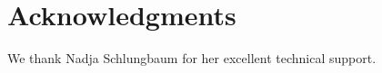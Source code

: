 \documentclass[10pt,letterpaper]{article}
\newcommand{\question}[1]{\textcolor{red}{#1}}
\begin{document}




\section*{Acknowledgments}
We thank Nadja Schlungbaum for her excellent technical support.
\end{document}
